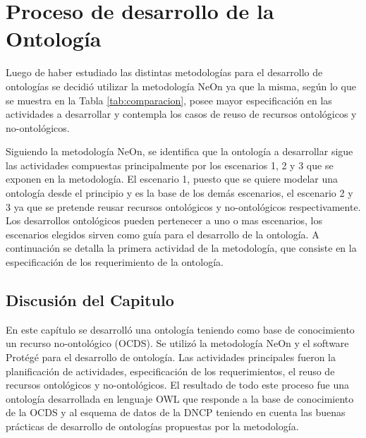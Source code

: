 \chapter{Proceso de desarrollo de la Ontología}
\label{chap:Desarrollo de la Ontologia}

Luego de haber estudiado las distintas metodologías para el desarrollo de ontologías se decidió utilizar la metodología NeOn ya que la misma, según lo que se muestra en la Tabla  \ref{tab:comparacion}, posee mayor especificación en las actividades a desarrollar  y contempla los casos de reuso de recursos ontológicos y no-ontológicos. 

Siguiendo la metodología NeOn, se identifica que la ontología a desarrollar sigue las actividades compuestas principalmente por los escenarios 1, 2 y 3 que se exponen en la metodología. El escenario 1, puesto que se quiere modelar una ontología desde el principio y es la base de los demás escenarios, el escenario 2 y 3 ya que se pretende reusar recursos ontológicos y no-ontológicos respectivamente. Los desarrollos ontológicos pueden pertenecer a uno o mas escenarios, los escenarios elegidos sirven como guía para el desarrollo de la ontología. A continuación se detalla la primera actividad de la metodología, que consiste en la especificación de los requerimiento de la ontología.









\section{Discusión del Capitulo}

En este capítulo se desarrolló una ontología teniendo como base de conocimiento un recurso no-ontológico (OCDS). Se utilizó la metodología NeOn y el software Protégé para el desarrollo de ontología. Las actividades principales fueron la planificación de actividades, especificación de los requerimientos, el reuso de recursos ontológicos y no-ontológicos. El resultado de todo este proceso fue una ontología desarrollada en lenguaje OWL que responde a la base de conocimiento de la OCDS y al esquema de datos de la DNCP teniendo en cuenta las buenas prácticas de desarrollo de ontologías propuestas por la metodología.




